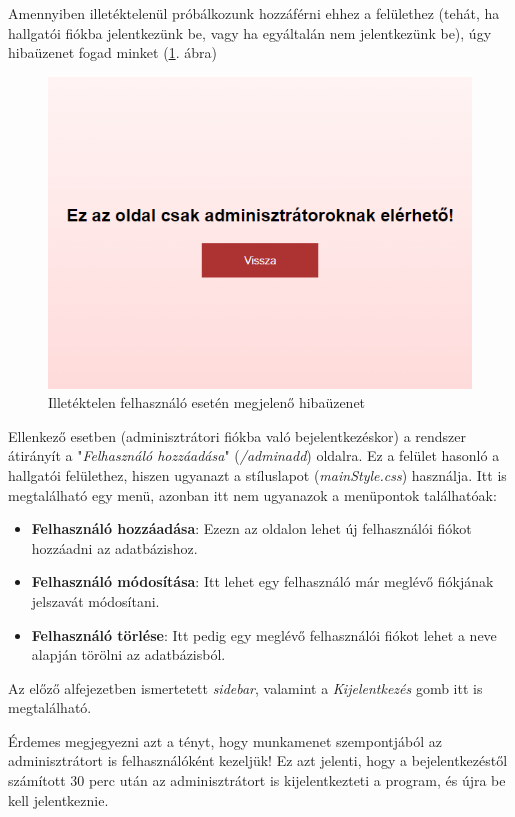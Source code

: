 Amennyiben illetéktelenül próbálkozunk hozzáférni ehhez a felülethez (tehát, ha hallgatói fiókba jelentkezünk be, vagy ha egyáltalán nem jelentkezünk be), úgy hibaüzenet fogad minket (\ref{fig:nemadmin}. ábra)

\begin{figure}[h]
	\centering
		\includegraphics[width=10truecm, height=7truecm]{images/nemadmin.png}
	\caption{Illetéktelen felhasználó esetén megjelenő hibaüzenet}
	\label{fig:nemadmin}
\end{figure}

\newpage

Ellenkező esetben (adminisztrátori fiókba való bejelentkezéskor) a rendszer átirányít a "\textit{Felhasználó hozzáadása}" (\textit{/adminadd}) oldalra. Ez a felület hasonló a hallgatói felülethez, hiszen ugyanazt a stíluslapot (\textit{mainStyle.css}) használja. Itt is megtalálható egy menü, azonban itt nem ugyanazok a menüpontok találhatóak:

\begin{itemize}
\item{\textbf{Felhasználó hozzáadása}: Ezezn az oldalon lehet új felhasználói fiókot hozzáadni az adatbázishoz.}
\item{\textbf{Felhasználó módosítása}: Itt lehet egy felhasználó már meglévő fiókjának jelszavát módosítani.}
\item{\textbf{Felhasználó törlése}: Itt pedig egy meglévő felhasználói fiókot lehet a neve alapján törölni az adatbázisból.}
\end{itemize}

Az előző alfejezetben ismertetett \textit{sidebar}, valamint a \textit{Kijelentkezés} gomb itt is megtalálható.

Érdemes megjegyezni azt a tényt, hogy munkamenet szempontjából az adminisztrátort is felhasználóként kezeljük! Ez azt jelenti, hogy a bejelentkezéstől számított 30 perc után az adminisztrátort is kijelentkezteti a program, és újra be kell jelentkeznie.